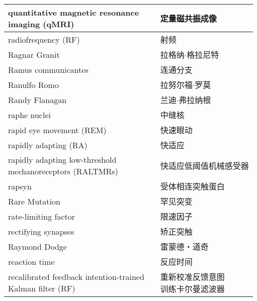 \begin{longtable}{lll}
	\midrule
	\makecell[l]{quantitative magnetic resonance \\imaging (qMRI)} && 定量磁共振成像  \\
	
	\midrule
	radiofrequency (RF)  && 射频  \\
	
	\midrule
	Ragnar Granit   && 拉格纳$\cdot$格拉尼特  \\
	
	\midrule
	Ramus communicantes   && 连通分支  \\
	
	\midrule
	Ranulfo Romo   && 拉努尔福$\cdot$罗莫  \\
	
	\midrule
	Randy Flanagan   && 兰迪$\cdot$弗拉纳根  \\
	
	\midrule
	raphe nuclei   && 中缝核  \\
	
	\midrule
	rapid eye movement (REM)   && 快速眼动  \\
	
	\midrule
	rapidly adapting (RA)   && 快适应  \\
	
	\midrule
	\makecell[l]{rapidly adapting low-threshold\\ mechanoreceptors (RALTMRs)}  && 快适应低阈值机械感受器  \\
	
	\midrule
	rapsyn  && 受体相连突触蛋白  \\
	
	\midrule
	Rare Mutation  && 罕见突变  \\
	
	\midrule
	rate-limiting factor  && 限速因子  \\
	
	\midrule
	rectifying synapses  && 矫正突触  \\
	
	\midrule
	Raymond Dodge  && 雷蒙德・道奇  \\
	
	\midrule
	reaction time  && 反应时间  \\
	
	\midrule
	\makecell[l]{recalibrated feedback intention-trained\\ Kalman filter (RF)}   && \makecell[l]{重新校准反馈意图\\训练卡尔曼滤波器}  \\
	

\end{longtable}
